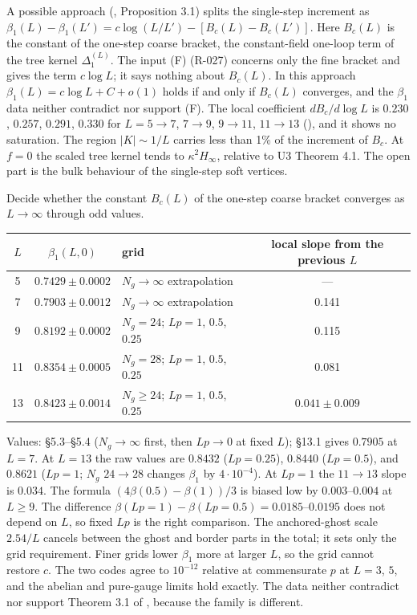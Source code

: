 \begin{remark}
A possible approach (, Proposition 3.1) splits the single-step increment as $\beta_1(L)-\beta_1(L')=c\log(L/L')-[B_c(L)-B_c(L')]$. Here $B_c(L)$ is the constant of the one-step coarse bracket, the constant-field one-loop term of the tree kernel $\Delta_1^{(L)}$. The input (F) (R-027) concerns only the fine bracket and gives the term $c\log L$; it says nothing about $B_c(L)$. In this approach $\beta_1(L)=c\log L+C+o(1)$ holds if and only if $B_c(L)$ converges, and the $\beta_1$ data neither contradict nor support (F). The local coefficient $dB_c/d\log L$ is $0.230$, $0.257$, $0.291$, $0.330$ for $L=5\to7$, $7\to9$, $9\to11$, $11\to13$ (), and it shows no saturation. The region $|K|\sim1/L$ carries less than 1\% of the increment of $B_c$. At $f=0$ the scaled tree kernel tends to $\kappa^2H_\infty$, relative to U3 Theorem 4.1. The open part is the bulk behaviour of the single-step soft vertices.
\end{remark}

\begin{openproblem}
Decide whether the constant $B_c(L)$ of the one-step coarse bracket converges as $L\to\infty$ through odd values.
\end{openproblem}

\begin{longtable}{|c|c|p{6.2cm}|c|}
\hline
$L$ & $\beta_1(L,0)$ & grid & local slope from the previous $L$ \\ \hline
5 & $0.7429\pm0.0002$ & $N_g\to\infty$ extrapolation & --- \\ \hline
7 & $0.7903\pm0.0012$ & $N_g\to\infty$ extrapolation & 0.141 \\ \hline
9 & $0.8192\pm0.0002$ & $N_g=24$; $Lp=1$, $0.5$, $0.25$ & 0.115 \\ \hline
11 & $0.8354\pm0.0005$ & $N_g=28$; $Lp=1$, $0.5$, $0.25$ & 0.081 \\ \hline
13 & $0.8423\pm0.0014$ & $N_g\ge24$; $Lp=1$, $0.5$, $0.25$ & $0.041\pm0.009$ \\ \hline
\end{longtable}
Values:  \S5.3--\S5.4 ($N_g\to\infty$ first, then $Lp\to0$ at fixed $L$);  \S13.1 gives $0.7905$ at $L=7$. At $L=13$ the raw values are $0.8432$ ($Lp=0.25$), $0.8440$ ($Lp=0.5$), and $0.8621$ ($Lp=1$; $N_g$ $24\to28$ changes $\beta_1$ by $4\cdot10^{-4}$). At $Lp=1$ the $11\to13$ slope is $0.034$. The formula $(4\beta(0.5)-\beta(1))/3$ is biased low by $0.003$--$0.004$ at $L\ge9$. The difference $\beta(Lp=1)-\beta(Lp=0.5)=0.0185$--$0.0195$ does not depend on $L$, so fixed $Lp$ is the right comparison. The anchored-ghost scale $2.54/L$ cancels between the ghost and border parts in the total; it sets only the grid requirement. Finer grids lower $\beta_1$ more at larger $L$, so the grid cannot restore $c$. The two codes agree to $10^{-12}$ relative at commensurate $p$ at $L=3$, $5$, and the abelian and pure-gauge limits hold exactly. The data neither contradict nor support Theorem 3.1 of , because the family is different.

